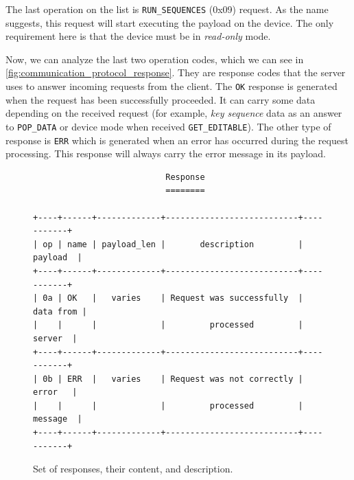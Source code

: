 The last operation on the list is \verb|RUN_SEQUENCES| (0x09) request. As the name suggests, this request will start executing the payload on the device. The only requirement here is that the device must be in \emph{read-only} mode.

Now, we can analyze the last two operation codes, which we can see in \autoref{fig:communication_protocol_response}. They are response codes that the server uses to answer incoming requests from the client. The \verb|OK| response is generated when the request has been successfully proceeded. It can carry some data depending on the received request (for example, \emph{key sequence} data as an answer to \verb|POP_DATA| or device mode when received \verb|GET_EDITABLE|). The other type of response is \verb|ERR| which is generated when an error has occurred during the request processing. This response will always carry the error message in its payload.

\begin{figure}[ht]
\centering
\begin{varwidth}{\linewidth}
\begin{verbatim}
                           Response
                           ========

+----+------+-------------+---------------------------+-----------+
| op | name | payload_len |       description         |  payload  |
+----+------+-------------+---------------------------+-----------+
| 0a | OK   |   varies    | Request was successfully  | data from |
|    |      |             |         processed         |   server  |
+----+------+-------------+---------------------------+-----------+
| 0b | ERR  |   varies    | Request was not correctly |   error   |
|    |      |             |         processed         |  message  |
+----+------+-------------+---------------------------+-----------+
\end{verbatim}
\end{varwidth}
\caption{Set of responses, their content, and description.}
\label{fig:communication_protocol_response}
\end{figure}

